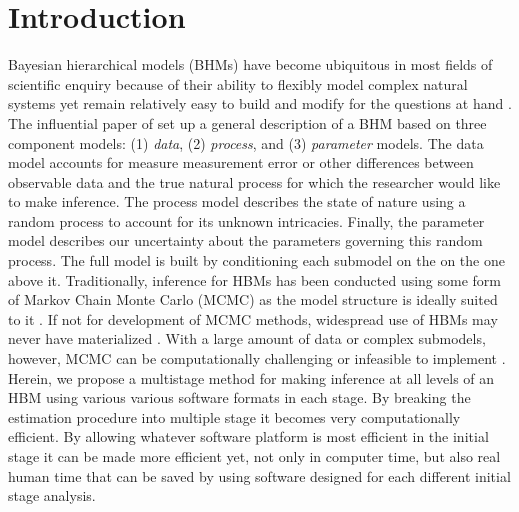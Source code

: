 \documentclass[12pt]{article}
\newcommand{\cmt}[1]{\todo[inline]{\color{blue} {\sc Comment:} \newline #1}}
\begin{document}
\vspace*{\fill}

\clearpage

\renewcommand{\baselinestretch}{1.5}\normalsize
\raggedright
\setlength{\parindent}{2em}
\raggedbottom
\linenumbers

\section{Introduction}

\cmt{Here's a comment if you want to say something}

Bayesian hierarchical models (BHMs) have become ubiquitous in most fields of scientific enquiry because of their ability to flexibly model complex natural systems yet remain relatively easy to build and modify for the questions at hand \citep{hobbs2015bayesian}. The influential paper of \cite{berliner1996hierarchical} set up a general description of a BHM based on three component models: (1) {\it data}, (2) {\it process}, and (3) {\it parameter} models. The data model accounts for measure measurement error or other differences between observable data and the true natural process for which the researcher would like to make inference. The process model describes the state of nature using a random process to account for its unknown intricacies. Finally, the parameter model describes our uncertainty about the parameters governing this random process.  The full model is built by conditioning each submodel on the on the one above it. Traditionally, inference for HBMs has been conducted using some form of Markov Chain Monte Carlo (MCMC) as the model structure is ideally suited to it \citep{gelfand1990sampling,gelfand2015hierarchical}. If not for development of MCMC methods, widespread use of HBMs may never have materialized \citep{green2015bayesian}. With a large amount of data or complex submodels, however, MCMC can be computationally challenging or infeasible to implement \citep{hooten2018prior, wikle2003hierarchical}. Herein, we propose a multistage method for making inference at all levels of an HBM using various various software formats in each stage. By breaking the estimation procedure into multiple stage it becomes very computationally efficient. By allowing whatever software platform is most efficient in the initial stage it can be made more efficient yet, not only in computer time, but also real human time that can be saved by using software designed for each different initial stage analysis. 
\end{document}
